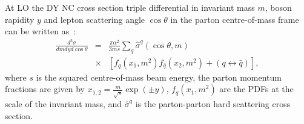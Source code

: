 
At LO the DY NC cross section triple differential in invariant mass \(m\), boson rapidity \(y\) 
and lepton scattering angle \(\cos\theta\) in the parton centre-of-mass frame can be written as~\cite{Drell:1970wh,Yamada:1981mw}:
\begin{eqnarray}
 \frac{d^3\sigma}{dm{d}y d\cos\theta} &=&  
 \frac{\pi\alpha^2}{3ms}\sum\limits_{q}\hat{\sigma}^{q}(\cos\theta, m)  \nonumber \\
 &\times &\left[f_q(x_1,m^2)f_{\bar{q}}(x_2,m^2) 
 + (q\leftrightarrow\bar{q})\right],
\end{eqnarray}
where \(s\) is the squared centre-of-mass beam energy, the parton momentum fractions are given by \(x_{1,2} = \frac{m}{\sqrt{s}}\exp(\pm y)\), $f_q(x_1,m^2)$ 
are the PDFs at the scale of the invariant mass, and 
$\hat{\sigma}^{q}$ is the parton-parton hard scattering cross section. 
%
